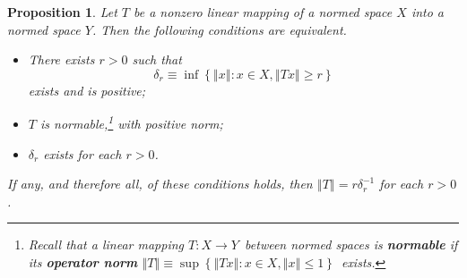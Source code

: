 \documentclass[11pt]{article}%
\newtheorem{proposition}[theorem]{Proposition}
\begin{document}
\begin{proposition}
\label{apr20p1}Let $T$ be a nonzero linear mapping of a normed space $X$ into
a normed space $Y$. Then the following conditions are equivalent.

\begin{itemize}
\item[\emph{(a)}] There exists $r>0$ such that%
\[
\delta_{r}\equiv\inf\left\{  \left\Vert x\right\Vert :x\in X,\left\Vert
Tx\right\Vert \geq r\right\}
\]
exists and is positive;

\item[\emph{(b)}] $T$ is normable,\footnote{%
\normalfont\sf
\textsf{Recall that a linear mapping }$T:X\rightarrow Y$\textsf{\ between
normed spaces is \textbf{normable} if its \textbf{operator norm} }$\left\Vert
T\right\Vert \equiv\sup\left\{  \left\Vert Tx\right\Vert :x\in X,\left\Vert
x\right\Vert \leq1\right\}  $\textsf{\ exists.}} with positive norm;

\item[\emph{(c)}] $\delta_{r}$ exists for each $r>0$.
\end{itemize}

%

\noindent
If any, and therefore all, of these conditions holds, then $\left\Vert
T\right\Vert =r\delta_{r}^{-1}$ for each $r>0$.
\end{proposition}
\end{document}

